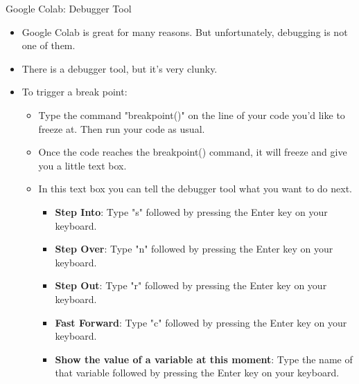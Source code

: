 \documentclass[10pt, aspectratio=169]{beamer}
\begin{document}
\begin{frame}{Google Colab: Debugger Tool}
    \label{frame:gcdebug}
    \begin{itemize}
        \item Google Colab is great for many reasons. But unfortunately, debugging is not one of them.
        \item There is a debugger tool, but it's very clunky.
        \vspace{0.5cm}
        \item To trigger a break point:
        \begin{itemize}
            \item Type the command "breakpoint()" on the line of your code you'd like to freeze at. Then run your code as usual.
            \item Once the code reaches the breakpoint() command, it will freeze and give you a little text box. 
            \item In this text box you can tell the debugger tool what you want to do next.
            \begin{itemize}
                \item \textbf{Step Into}: Type "s" followed by pressing the Enter key on your keyboard.
                \item \textbf{Step Over}: Type "n" followed by pressing the Enter key on your keyboard.
                \item \textbf{Step Out}: Type "r" followed by pressing the Enter key on your keyboard.
                \item \textbf{Fast Forward}: Type "c" followed by pressing the Enter key on your keyboard.
                \item \textbf{Show the value of a variable at this moment}: Type the name of that variable followed by pressing the Enter key on your keyboard.
            \end{itemize}
        \end{itemize}
    \end{itemize}
\end{frame}
\end{document}
